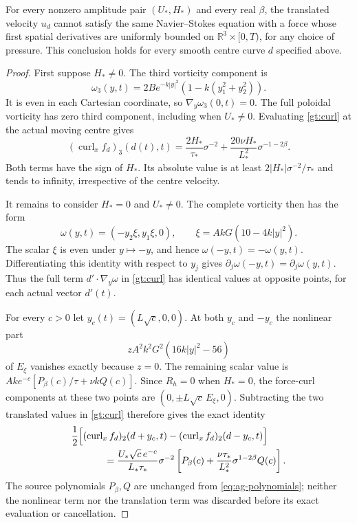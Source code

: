 \begin{theorem}
For every nonzero amplitude pair $(U_*,H_*)$ and every real
$\beta$, the translated velocity $u_d$ cannot satisfy the same
Navier--Stokes equation with a force whose first spatial
derivatives are uniformly bounded on $\mathbb R^3\times[0,T)$,
for any choice of pressure. This conclusion holds for every
smooth centre curve $d$ specified above.
\end{theorem}
\begin{proof}
First suppose $H_*\ne0$. The third vorticity component is
\[
 \omega_3(y,t)=2B e^{-k|y|^2}
                       (1-k(y_1^2+y_2^2)).
\]
It is even in each Cartesian coordinate, so
$\nabla_y\omega_3(0,t)=0$. The full poloidal vorticity has
zero third component, including when $U_*\ne0$.
Evaluating \eqref{gt:curl} at the actual moving centre gives
\begin{equation}
 (\operatorname{curl}_xf_d)_3(d(t),t)
  =\frac{2H_*}{\tau_*}\sigma^{-2}
      +\frac{20\nu H_*}{L_*^2}\sigma^{-1-2\beta}.
 \label{gt:swirl}
\end{equation}
Both terms have the sign of $H_*$. Its absolute value is at
least $2|H_*|\sigma^{-2}/\tau_*$ and tends to infinity,
irrespective of the centre velocity.

It remains to consider $H_*=0$ and $U_*\ne0$.
The complete vorticity then has the form
\[
 \omega(y,t)=(-y_2\xi,y_1\xi,0),\qquad
 \xi=AkG(10-4k|y|^2).
\]
The scalar $\xi$ is even under $y\mapsto-y$, and hence
$\omega(-y,t)=-\omega(y,t)$. Differentiating this identity
with respect to $y_j$ gives
$\partial_j\omega(-y,t)=\partial_j\omega(y,t)$.
Thus the full term $d'\cdot\nabla_y\omega$ in
\eqref{gt:curl} has identical values at opposite points,
for each actual vector $d'(t)$.

For every $c>0$ let $y_c(t)=(L\sqrt c,0,0)$.
At both $y_c$ and $-y_c$ the nonlinear part
\[
 zA^2k^2G^2(16k|y|^2-56)
\]
of $E_\xi$ vanishes exactly because $z=0$.
The remaining scalar value is
$Ak e^{-c}[P_\beta(c)/\tau+\nu kQ(c)]$.
Since $R_h=0$ when $H_*=0$, the force-curl components at
these two points are $(0,\pm L\sqrt c\,E_\xi,0)$.
Subtracting the two translated values in \eqref{gt:curl}
therefore gives the exact identity
\begin{align}
 &\frac12\Big[
   (\operatorname{curl}_xf_d)_2(d+y_c,t)
   -(\operatorname{curl}_xf_d)_2(d-y_c,t)\Big]\notag\\
 &\hspace{12mm}
  =\frac{U_*\sqrt c\,e^{-c}}{L_*\tau_*}\sigma^{-2}
       \left[P_\beta(c)
         +\frac{\nu\tau_*}{L_*^2}
                  \sigma^{1-2\beta}Q(c)\right].
 \label{gt:opposite}
\end{align}
The source polynomials $P_\beta,Q$ are unchanged from
\eqref{eq:ag-polynomials}; neither the nonlinear term nor the
translation term was discarded before its exact evaluation
or cancellation.


\end{proof}
